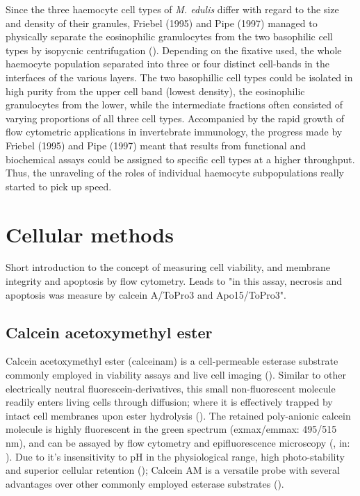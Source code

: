Since the three haemocyte cell types of \emph{M. edulis} differ with regard to the size and density of their granules, Friebel (1995) and Pipe (1997) managed to physically separate the eosinophilic granulocytes from the two basophilic cell types by isopycnic centrifugation (\cite{Friebel1995, Pipe1997}). Depending on the fixative used, the whole haemocyte population separated into three or four distinct cell-bands in the interfaces of the various layers. The two basophillic cell types could be isolated in high purity from the upper cell band (lowest density), the eosinophilic granulocytes from the lower, while the intermediate fractions often consisted of varying proportions of all three cell types. Accompanied by the rapid growth of flow cytometric applications in invertebrate immunology, the progress made by Friebel (1995) and Pipe (1997) meant that results from functional and biochemical assays could be assigned to specific cell types at a higher throughput. Thus, the unraveling of the roles of individual haemocyte subpopulations really started to pick up speed.




























\section{Cellular methods}
Short introduction to the concept of measuring cell viability, and membrane integrity and apoptosis by flow cytometry. Leads to "in this assay, necrosis and apoptosis was measure by calcein A/ToPro3 and Apo15/ToPro3".

\subsection{Calcein acetoxymethyl ester}
Calcein acetoxymethyl ester (\acrshort{calceinam}) is a cell-permeable esterase substrate commonly employed in viability assays and live cell imaging (\cite{Ramirez2010}). Similar to other electrically neutral fluorescein-derivatives, this small non-fluorescent molecule readily enters living cells through diffusion; where it is effectively trapped by intact cell membranes upon ester hydrolysis (\cite{Kaneshiro1993}). The retained poly-anionic calcein molecule is highly fluorescent in the green spectrum (\acrshort{exmax}/\acrshort{emmax}: 495/515 nm), and can be assayed by flow cytometry and epifluorescence microscopy (\cite{Wallach1959}, in: \cite{Chiu1977}). Due to it's insensitivity to pH in the physiological range, high photo-stability and superior cellular retention (\cite{Chiu1977, Kaneshiro1993}); Calcein AM is a versatile probe with several advantages over other commonly employed esterase substrates (\cite{Ramirez2010}).

